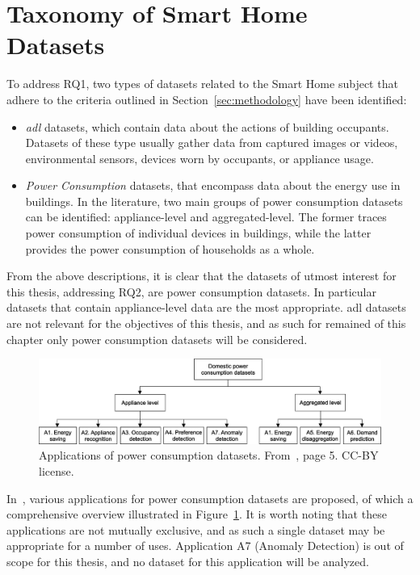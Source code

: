 \section{Taxonomy of Smart Home Datasets}

To address RQ1, two types of datasets related to the Smart Home subject that adhere to the criteria outlined in Section~\ref{sec:methodology} have been identified:
\begin{itemize}
    \item \textit{\acrfull{adl}} datasets, which contain data about the actions of building occupants. Datasets of these type usually gather data from captured images or videos, environmental sensors, devices worn by occupants, or appliance usage.
    \item \textit{Power Consumption} datasets, that encompass data about the energy use in buildings. In the literature, two main groups of power consumption datasets can be identified: appliance-level and aggregated-level. The former traces power consumption of individual devices in buildings, while the latter provides the power consumption of households as a whole.
\end{itemize}
From the above descriptions, it is clear that the datasets of utmost interest for this thesis, addressing RQ2, are power consumption datasets. In particular datasets that contain appliance-level data are the most appropriate. \acrshort{adl} datasets are not relevant for the objectives of this thesis, and as such for remained of this chapter only power consumption datasets will be considered.

\begin{figure}[h]
    \centering
    \includegraphics[width=.9\textwidth]{images/taxonomy_power_consumption.jpg}
    \caption[Applications of power consumption datasets]{Applications of power consumption datasets. From~\cite{himeurBuildingPowerConsumption2020}, page 5. CC-BY license.}
    \label{fig:applications_power_consumption_datasets}
\end{figure}

In~\parencite{himeurBuildingPowerConsumption2020}, various applications for power consumption datasets are proposed, of which a comprehensive overview illustrated in Figure~\ref{fig:applications_power_consumption_datasets}. It is worth noting that these applications are not mutually exclusive, and as such a single dataset may be appropriate for a number of uses. Application A7 (Anomaly Detection) is out of scope for this thesis, and no dataset for this application will be analyzed.

